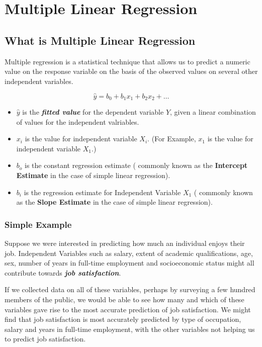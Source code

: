 \documentclass[a4paper,12pt]{article}
\begin{document}
\newpage
\section{Multiple Linear Regression}
\subsection{What is Multiple Linear Regression}

Multiple regression is a statistical technique that allows us to predict a numeric value on the response variable on the basis of the observed values on several other independent variables.


\[\hat{y} = b_0 + b_1x_1 + b_2x_2 + \ldots \]

\begin{itemize}
\item $\hat{y}$ is the \textbf{\textit{fitted value}} for the dependent variable \textbf{$Y$}, given a linear combination of values for the independent valriables.

\item $x_i$ is the value for independent variable \textbf{$X_i$}. (For Example, $x_1$ is the value for independent variable \textbf{$X_1$}.)
\item $b_o$ is the constant regression estimate ( commonly known as the \textbf{Intercept Estimate} in the case of simple linear regression).
\item $b_i$ is the regression estimate for Independent Variable \textbf{$X_1$} ( commonly known as the \textbf{Slope Estimate} in the case of simple linear regression).
\end{itemize}

\subsubsection{Simple Example}
Suppose we were interested in predicting how much an individual enjoys their job. Independent Variables such as salary, extent of academic qualifications, age, sex, number of years in full-time employment and socioeconomic status might all contribute towards \textbf{\textit{job satisfaction}}.

If we collected data on all of these variables, perhaps by surveying a few hundred members of the public, we would be able to see how many and which of these variables gave rise to the most accurate prediction of job satisfaction. We might find that job satisfaction is most accurately predicted by type of occupation, salary and years in full-time employment, with the other variables not helping us to predict job satisfaction.
\end{document}
